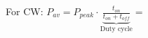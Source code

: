 \documentclass[preview]{standalone}
\begin{document}
\begin{center}
For CW: $P_{av} = P_{peak} \cdot \underbrace{\frac{t_{on}}{t_{on}+t_{off}}}_{\text{Duty cycle}}=$
\end{center}
\end{document}
